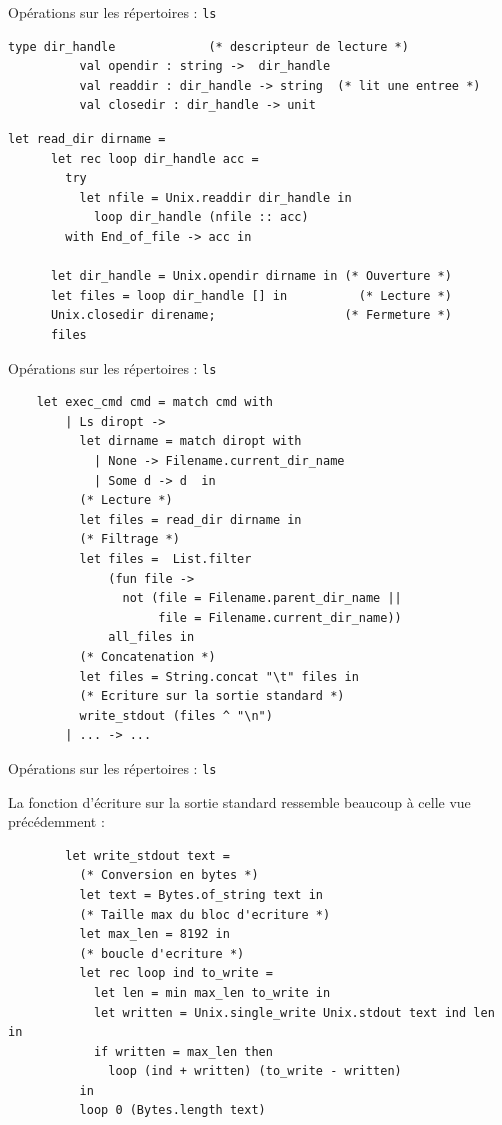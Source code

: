 \begin{frame}[fragile]{Opérations sur les répertoires : \texttt{ls}}
    \begin{lstlisting}[basicstyle=\scriptsize\ttfamily]
          type dir_handle             (* descripteur de lecture *)
          val opendir : string ->  dir_handle
          val readdir : dir_handle -> string  (* lit une entree *)
          val closedir : dir_handle -> unit
    \end{lstlisting}

    \begin{lstlisting}[basicstyle=\scriptsize\ttfamily]
    let read_dir dirname =
      let rec loop dir_handle acc =
        try
          let nfile = Unix.readdir dir_handle in
            loop dir_handle (nfile :: acc)
        with End_of_file -> acc in

      let dir_handle = Unix.opendir dirname in (* Ouverture *)
      let files = loop dir_handle [] in          (* Lecture *)
      Unix.closedir direname;                  (* Fermeture *)
      files
    \end{lstlisting}
\end{frame}

\begin{frame}[fragile]{Opérations sur les répertoires : \texttt{ls}}
        \begin{lstlisting}
    let exec_cmd cmd = match cmd with
        | Ls diropt ->
          let dirname = match diropt with
            | None -> Filename.current_dir_name
            | Some d -> d  in
          (* Lecture *)
          let files = read_dir dirname in
          (* Filtrage *)
          let files =  List.filter
              (fun file ->
                not (file = Filename.parent_dir_name ||
                     file = Filename.current_dir_name))
              all_files in
          (* Concatenation *)
          let files = String.concat "\t" files in
          (* Ecriture sur la sortie standard *)
          write_stdout (files ^ "\n")
        | ... -> ...
        \end{lstlisting}
\end{frame}

\begin{frame}[fragile]{Opérations sur les répertoires : \texttt{ls}}

    La fonction d'écriture sur la sortie standard ressemble beaucoup à celle vue précédemment :
    \begin{lstlisting}
        let write_stdout text =
          (* Conversion en bytes *)
          let text = Bytes.of_string text in
          (* Taille max du bloc d'ecriture *)
          let max_len = 8192 in
          (* boucle d'ecriture *)
          let rec loop ind to_write =
            let len = min max_len to_write in
            let written = Unix.single_write Unix.stdout text ind len in
            if written = max_len then
              loop (ind + written) (to_write - written)
          in
          loop 0 (Bytes.length text)
    \end{lstlisting}
\end{frame}

